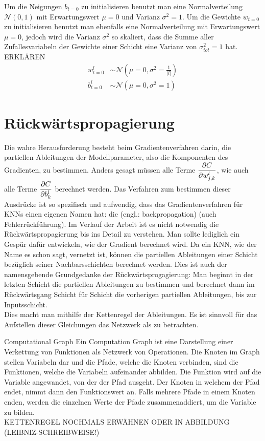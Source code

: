 Um die Neigungen $b_{t=0}$ zu initialisieren benutzt man eine Normalverteilung
$\mathcal{N}(0,1)$ mit Erwartungswert $\mu = 0$ und Varianz $\sigma^2 =
1$. Um die Gewichte $w_{t=0}$ zu initialisieren benutzt man ebenfalls eine
Normalverteilung mit Erwartungswert $\mu = 0$, jedoch wird die Varianz
$\sigma^2$ so skaliert, dass die Summe aller Zufallesvariabeln der Gewichte
einer Schicht eine Varianz von $\sigma^2_{tot} = 1$ hat. ERKLÄREN
\begin{align}
  w_{t=0}^l &\sim \mathcal{N}(\mu = 0, \sigma^2 = \frac{1}{|l|}) \\
  b_{t=0}^l &\sim \mathcal{N}(\mu = 0, \sigma^2 = 1)
\end{align}


\para{}
\cite{wiki:normal_distribution}
\cite{Nielsen}

\section{Rückwärtspropagierung}\label{sec:backpropagation}
Die wahre Herausforderung besteht beim Gradientenverfahren darin,
die partiellen Ableitungen der Modellparameter,
also die Komponenten des Gradienten, zu bestimmen.
Anders gesagt müssen alle Terme
$\displaystyle\frac{\partial C}{\partial w_{j,k}^l}$, wie auch alle Terme $\displaystyle\frac{\partial C}{\partial b_k^l}$
berechnet werden.
Das Verfahren zum bestimmen dieser Ausdrücke ist so spezifisch und aufwendig,
dass das Gradientenverfahren für KNNs einen eigenen Namen hat: die
 (engl.: backpropagation) (auch Fehlerrückführung).
Im Verlauf der Arbeit ist es nicht notwendig die Rückwärtspropagierung bis ins
Detail zu verstehen. Man sollte lediglich ein Gespür dafür entwickeln, wie
der Gradient berechnet wird.
\para{}
Da ein KNN, wie der Name es schon sagt, vernetzt ist, können die partiellen
Ableitungen einer Schicht bezüglich seiner Nachbarsschichten berechnet werden.
Dies ist auch der namensgebende Grundgedanke der Rückwärtsprogagierung: Man
beginnt in der letzten Schicht die partiellen Ableitungen zu bestimmen und
berechnet dann im Rückwärtsgang Schicht für Schicht die vorherigen
partiellen Ableitungen, bis zur Inputsschicht. \\
Dies macht man mithilfe der Kettenregel der Ableitungen.
Es ist sinnvoll für das Aufstellen dieser Gleichungen das Netzwerk als
 zu betrachten.
\para{}
\begin{infobox}{Computational Graph}
  Ein Computation Graph ist eine Darstellung einer Verkettung von Funktionen als Netzwerk von Operationen.
  Die Knoten im Graph stellen Variabeln dar und die Pfade, welche die Knoten
  verbinden, sind die Funktionen, welche die Variabeln aufeinander abbilden. Die
  Funktion wird auf die Variable angewandet, von der der Pfad ausgeht. Der Knoten
  in welchem der Pfad endet, nimmt dann den Funktionswert an. Falls
  mehrere Pfade in einem Knoten enden, werden die einzelnen Werte der Pfade
  zusammenaddiert, um die Variable zu bilden. \\
  KETTENREGEL NOCHMALS ERWÄHNEN ODER
  IN ABBILDUNG (LEIBNIZ-SCHREIBWEISE!)
\end{infobox}
